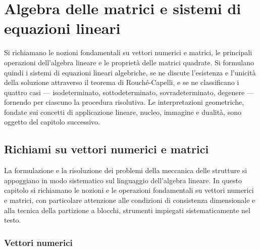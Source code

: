 \graphicspath{{Parti/P01-Preliminari/A02-Algebra_Matrici_Sistemi_Lineari/Figure/}}
\chapter{Algebra delle matrici e  sistemi di equazioni lineari}\label{app:algebra_eqlineari}

\begin{sommario}
	Si richiamano le nozioni fondamentali su vettori numerici 
	e matrici, le principali operazioni dell'algebra lineare e 
	le proprietà delle matrici quadrate. Si formulano quindi i 
	sistemi di equazioni lineari algebriche, se ne discute 
	l'esistenza e l'unicità della soluzione attraverso il 
	teorema di Rouché-Capelli, e se ne classificano i quattro 
	casi --- isodeterminato, sottodeterminato, sovradeterminato, 
	degenere --- fornendo per ciascuno la procedura risolutiva. 
	Le interpretazioni geometriche, fondate sui concetti di 
	applicazione lineare, nucleo, immagine e dualità, sono 
	oggetto del capitolo successivo.
\end{sommario}
%	


\section{Richiami su vettori numerici e matrici}

La formulazione e la risoluzione dei problemi della meccanica delle strutture si appoggiano in modo sistematico sul linguaggio dell'algebra lineare. In questo capitolo si richiamano le nozioni e le operazioni 	fondamentali su vettori numerici e matrici, con particolare attenzione 	alle condizioni di consistenza dimensionale e alla tecnica della partizione a blocchi, strumenti impiegati sistematicamente nel testo.


\subsection{Vettori numerici}

